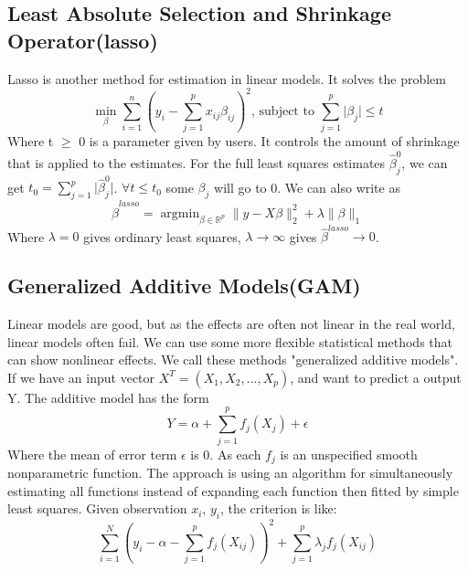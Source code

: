 \documentclass[11pt]{article}
\DeclareMathOperator*{\argminB}{argmin}   %
\begin{document}
\subsection{Least Absolute Selection and Shrinkage Operator(lasso)}  
Lasso is another method for estimation in linear models. It solves the problem $$\min_{\beta} \sum_{i=1}^{n} (y_i-\sum_{j=1}^{p} x_{ij}\beta_{ij})^2 \text{, subject to } \sum_{j=1}^{p} \lvert \beta_j \rvert \leq t$$
Where t $\geq$ 0 is a parameter given by users. It controls the amount of shrinkage that is applied to the estimates. For the full least squares estimates $\hat{\beta}^0_j$, we can get $t_0=\sum_{j=1}^{p} \lvert \hat{\beta}^0_j \rvert$. $\forall t \leq t_0$ some $\beta_j$ will go to 0. We can also write as $$\hat\beta^{lasso}=\argminB_{\beta \in \mathbb{R}^p} \lVert y-X\beta\rVert^2_2+\lambda\lVert \beta \rVert_1$$
Where $\lambda=0$ gives ordinary least squares, $\lambda\to\infty$ gives $\hat\beta^{lasso}\to0$. 

\subsection{Generalized Additive Models(GAM)}  
Linear models are good, but as the effects are often not linear in the real world, linear models often fail. We can use some more flexible statistical methods that can show nonlinear effects. We call these methods "generalized additive models". If we have an input vector $X^T=(X_1,X_2,...,X_p)$, and want to predict a output Y. The additive model has the form $$Y=\alpha+\sum_{j=1}^{p} f_j(X_j)+\epsilon$$
Where the mean of error term $\epsilon$ is 0. As each $f_j$ is an unspecified smooth nonparametric function. The approach is using an algorithm for simultaneously estimating all functions instead of expanding each function then fitted by simple least squares. Given observation $x_i$, $y_i$, the criterion is like: $$\sum_{i=1}^{N} (y_i-\alpha-\sum_{j=1}^{p}f_j(X_{ij}))^2+\sum_{j=1}^{p} \lambda_jf_j(X_{ij})$$
\end{document}
